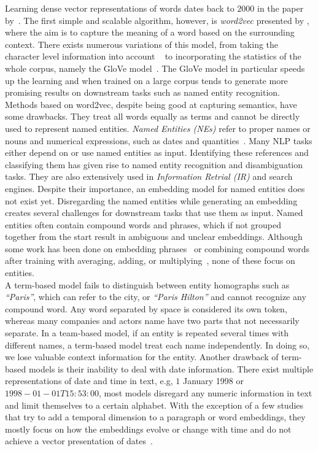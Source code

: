 Learning dense vector representations of words dates back to $2000$ in the paper by~. The first simple and scalable algorithm, however, is \emph{word2vec} presented by , where the aim is to capture the meaning of a word based on the surrounding context. There exists numerous variations of this model, from taking the character level information into account ~ to incorporating the statistics of the whole corpus, namely the GloVe model~. The GloVe model in particular speeds up the learning and when trained on a large corpus tends to generate more promising results on downstream tasks such as named entity recognition.\\
Methods based on word2vec, despite being good at capturing semantics, have some drawbacks. They treat all words equally as terms and cannot be directly used to represent named entities. \emph{Named Entities (NEs)} refer to proper names or nouns and numerical
expressions, such as dates and quantities~.
Many NLP tasks either depend on or use named entities as input. Identifying these references and classifying them has given rise to named entity recognition and disambiguation tasks. They are also extensively used in \emph{Information Retrial (IR)} and search engines. Despite their importance, an embedding model for named entities does not exist yet. Disregarding the named entities while generating an embedding creates several challenges for downstream tasks that use them as input. Named entities often contain compound words and phrases, which if not grouped together from the start result in ambiguous and unclear embeddings. Although some work has been done on embedding phrases~ or combining compound words after training with averaging, adding, or multiplying~, none of these focus on entities. \\
A term-based model fails to distinguish between entity homographs such as  \emph{``Paris''},  which can refer to the city, or \emph{``Paris Hilton''} and cannot recognize any compound word. Any word separated by space is considered its own token, whereas many companies and actors name have two parts that not necessarily separate.  In a team-based model, if an entity is repeated several times with different names, a term-based model treat each name independently. In doing so, we lose valuable context information for the entity. Another drawback of term-based models is their inability to deal with date information. There exist multiple representations of date and time in text, e.g, $1$ January 1998 or $1998-01-01T15:53:00$, most models disregard any numeric information in text and limit themselves to a certain alphabet. With the exception of a few studies that try to add a temporal dimension to a paragraph or word embeddings, they mostly focus on how the embeddings evolve or change with time and do not achieve a vector presentation of dates~.  \\
